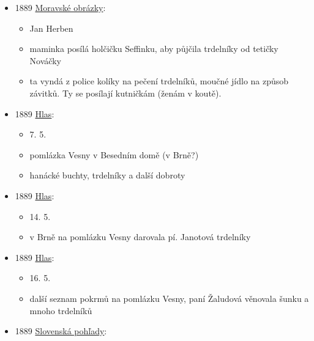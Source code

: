 \begin{itemize}
  \begin{itemize}
  \tightlist
  \item
    \emph{Kronika vlasten. spolku muzej. v Olomouci}
  \item
    popis svatby v Ořechově u Brna 
  \item
    podávali trdelníky, makovníky, trnčáky, jabčáky, buchty, koláče
  \end{itemize}
\item
  1889
  \href{https://ndk.cz/view/uuid:df0f4040-895f-11dd-a7d7-000d606f5dc6?page=uuid\%3A1bb49280-82c0-11e7-94b3-005056825209&fulltext=trdeln\%C3\%ADky}{Moravské
  obrázky}:

  \begin{itemize}
  \tightlist
  \item
    Jan Herben
  \item
    maminka posílá holčičku Seffinku, aby půjčila trdelníky od tetičky
    Nováčky
  \item
    ta vyndá z police kolíky na pečení trdelníků, moučné jídlo na způsob
    závitků. Ty se posílají kutničkám (ženám v koutě).
  \end{itemize}
\item
  1889
  \href{https://www.digitalniknihovna.cz/vkol/uuid/uuid:3a12df2c-c1ab-42a4-a423-5746952a0111}{Hlas}:

  \begin{itemize}
  \tightlist
  \item
    7. 5.
  \item
    pomlázka Vesny v Besedním domě (v Brně?)
  \item
    hanácké buchty, trdelníky a další dobroty
  \end{itemize}
\item
  1889
  \href{https://www.digitalniknihovna.cz/vkol/uuid/uuid:3812f912-9ea8-47ca-a48a-9f05bbf2f865}{Hlas}:

  \begin{itemize}
  \tightlist
  \item
    14. 5.
  \item
    v Brně na pomlázku Vesny darovala pí. Janotová trdelníky
  \end{itemize}
\item
  1889
  \href{https://www.digitalniknihovna.cz/vkol/uuid/uuid:e3711822-42a1-4f0a-a01b-a367dd03f2b9}{Hlas}:

  \begin{itemize}
  \tightlist
  \item
    16. 5.
  \item
    další seznam pokrmů na pomlázku Vesny, paní Žaludová věnovala šunku
    a mnoho trdelníků
  \end{itemize}
\item
  1889
  \href{https://dikda.snk.sk/view/uuid:1ecf9029-7613-401d-843c-e2938a484970?page=uuid:43b26cf7-af4a-4231-8901-ba41c009c9e7&fulltext=trdeln\%C3\%ADk\%20OR\%20trdeln\%C3\%ADka\%20OR\%20trdeln\%C3\%ADku}{Slovenská
  pohľady}:


\end{itemize}
